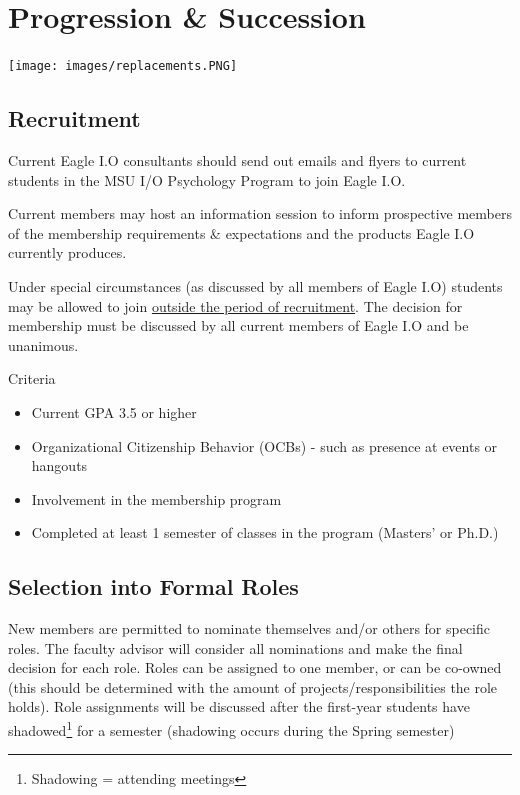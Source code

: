 \documentclass[
]{book}
\providecommand{\tightlist}{%
  \setlength{\itemsep}{0pt}\setlength{\parskip}{0pt}}
\begin{document}
\hypertarget{progression-succession}{%
\chapter{Progression \& Succession}\label{progression-succession}}

\texttt{[image: images/replacements.PNG]}

\hypertarget{recruitment}{%
\section{Recruitment}\label{recruitment}}

Current Eagle I.O consultants should send out emails and flyers to current students in the MSU I/O Psychology Program to join Eagle I.O.

Current members may host an information session to inform prospective members of the membership requirements \& expectations and the products Eagle I.O currently produces.

Under special circumstances (as discussed by all members of Eagle I.O) students may be allowed to join \protect\hyperlink{late}{outside the period of recruitment}. The decision for membership must be discussed by all current members of Eagle I.O and be unanimous.

Criteria

\begin{itemize}
\tightlist
\item
  Current GPA 3.5 or higher
\item
  Organizational Citizenship Behavior (OCBs) - such as presence at events or hangouts
\item
  Involvement in the membership program
\item
  Completed at least 1 semester of classes in the program (Masters' or Ph.D.)
\end{itemize}

\hypertarget{selection-into-formal-roles}{%
\section{Selection into Formal Roles}\label{selection-into-formal-roles}}

New members are permitted to nominate themselves and/or others for specific roles. The faculty advisor will consider all nominations and make the final decision for each role. Roles can be assigned to one member, or can be co-owned (this should be determined with the amount of projects/responsibilities the role holds). Role assignments will be discussed after the first-year students have shadowed\footnote{Shadowing = attending meetings} for a semester (shadowing occurs during the Spring semester)
\end{document}
